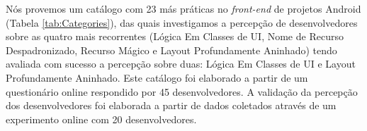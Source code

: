 Nós provemos um catálogo com 23 más práticas no \textit{front-end} de projetos Android (Tabela \ref{tab:Categories}), das quais investigamos a percepção de desenvolvedores sobre as quatro mais recorrentes (Lógica Em Classes de UI, Nome de Recurso Despadronizado, Recurso Mágico e Layout Profundamente Aninhado) tendo avaliada com sucesso a percepção sobre duas: Lógica Em Classes de UI e Layout Profundamente Aninhado. Este catálogo foi elaborado a partir de um questionário online respondido por 45 desenvolvedores. A validação da percepção dos desenvolvedores foi elaborada a partir de dados coletados através de um experimento online com 20 desenvolvedores.
